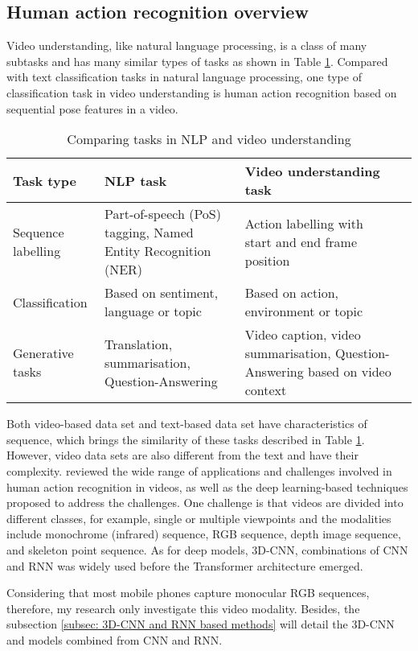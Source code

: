 \subsection{Human action recognition overview}
Video understanding, like natural language processing, is a class of many subtasks and has many similar types of tasks as shown in Table \ref{tab:Comparing tasks in natural}.
Compared with text classification tasks in natural language processing, one type of classification task in video understanding is human action recognition based on sequential pose features in a video.

\begin{table}[ht!]
\renewcommand{\arraystretch}{1.6}
\begin{tabularx}{\textwidth}{|l|X|X|X|}
\hline
\textbf{Task type} & \textbf{NLP task} & \textbf{Video understanding task} \\ \hline
Sequence labelling & Part-of-speech (PoS) tagging, Named Entity Recognition (NER) & Action labelling with start and end frame position \\ \hline
Classification & Based on sentiment, language or topic & Based on action, environment or topic \\ \hline
Generative tasks & Translation, summarisation, Question-Answering & Video caption, video summarisation, Question-Answering based on video context \\ \hline
\end{tabularx}
\caption{Comparing tasks in NLP and video understanding}
\label{tab:Comparing tasks in natural}
\end{table}

Both video-based data set and text-based data set have characteristics of sequence, which brings the similarity of these tasks described in Table \ref{tab:Comparing tasks in natural}. 
However, video data sets are also different from the text and have their complexity.
\citet{wu2017recent} reviewed the wide range of applications and challenges involved in human action recognition in videos, as well as the deep learning-based techniques proposed to address the challenges.
One challenge is that videos are divided into different classes, for example, single or multiple viewpoints and the modalities include monochrome (infrared) sequence, RGB sequence, depth image sequence, and skeleton point sequence. As for deep models, 3D-CNN, combinations of CNN and RNN was widely used before the Transformer architecture emerged.

Considering that most mobile phones capture monocular RGB sequences, therefore, my research only investigate this video modality.
Besides, the subsection \ref{subsec: 3D-CNN and RNN based methods} will detail the 3D-CNN and models combined from CNN and RNN.